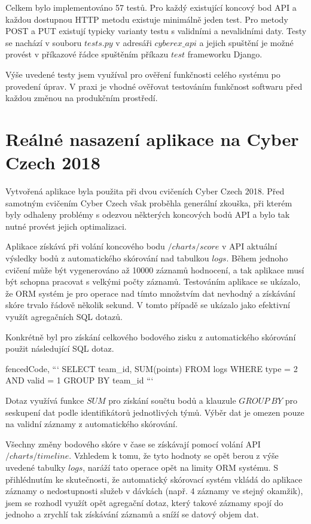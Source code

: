 \documentclass[
  digital,
  twoside,
  table, 
  nolof, 
  nolot
]{fithesis3}
\begin{document}
Celkem bylo implementováno 57 testů. Pro každý existující koncový bod API a každou dostupnou HTTP metodu existuje minimálně jeden test. Pro metody POST a PUT existují typicky varianty testu s validními a nevalidními daty. Testy se nachází v souboru $tests.py$ v adresáři $cyberex\_api$ a jejich spuštění je možné provést v příkazové řádce spuštěním příkazu $test$ frameworku Django.

Výše uvedené testy jsem využíval pro ověření funkčnosti celého systému po provedení úprav. V praxi je vhodné ověřovat testováním funkčnost softwaru před každou změnou na produkčním prostředí.

\section{Reálné nasazení aplikace na Cyber Czech 2018}

Vytvořená aplikace byla použita při dvou cvičeních Cyber Czech 2018. Před samotným cvičením Cyber Czech však proběhla generální zkouška, při kterém byly odhaleny problémy s odezvou některých koncových bodů API a bylo tak nutné provést jejich optimalizaci.

Aplikace získává při volání koncového bodu $/charts/score$ v API aktuální výsledky bodů z automatického skórování nad tabulkou $logs$. Během jednoho cvičení může být vygenerováno až 10000 záznamů hodnocení, a tak aplikace musí být schopna pracovat s velkými počty záznamů. Testováním aplikace se ukázalo, že ORM systém je pro operace nad tímto množstvím dat nevhodný a získávání skóre trvalo řádově několik sekund. V tomto případě se ukázalo jako efektivní využít agregačních SQL dotazů. 

Konkrétně byl pro získání celkového bodového zisku z automatického skórování použit následující SQL dotaz.

\begin{markdown*}{%
  fencedCode,
}
```
SELECT team_id, SUM(points) FROM logs 
WHERE type = 2 AND valid = 1 
GROUP BY team_id
```
\end{markdown*}

Dotaz využívá funkce $SUM$ pro získání součtu bodů a klauzule $GROUP\ BY$ pro seskupení dat podle identifikátorů jednotlivých týmů. Výběr dat je omezen pouze na validní záznamy z automatického skórování.

Všechny změny bodového skóre v čase se získávají pomocí volání API $/charts/timeline$. Vzhledem k tomu, že tyto hodnoty se opět berou z výše uvedené tabulky $logs$, naráží tato operace opět na limity ORM systému. S přihlédnutím ke skutečnosti, že automatický skórovací systém vkládá do aplikace záznamy o nedostupnosti služeb v dávkách (např. 4 záznamy ve stejný okamžik), jsem se rozhodl využít opět agregační dotaz, který takové záznamy spojí do jednoho a zrychlí tak získávání záznamů a sníží se datový objem dat.
\end{document}
